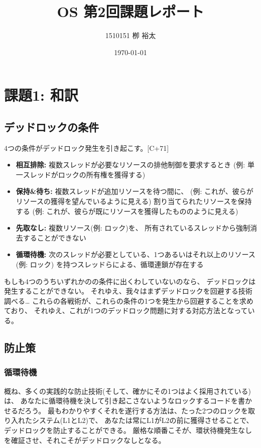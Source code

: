 \documentclass[11pt,a4paper, uplatex]{jsarticle}
\title{OS 第2回課題レポート}
\author{1510151  栁 裕太}
\date{\today}
\begin{document}
\maketitle
\section{課題1: 和訳}

\subsection{デッドロックの条件}
4つの条件がデッドロック発生を引き起こす。[C+71]

\begin{itemize}
  \item \textbf{相互排除:} 複数スレッドが必要なリソースの排他制御を要求するとき
  (例: 単一スレッドがロックの所有権を獲得する)

  \item \textbf{保持\&待ち:} 複数スレッドが追加リソースを待つ間に、
  (例: これが、彼らがリソースの獲得を望んでいるように見える)
  割り当てられたリソースを保持する
  (例: これが、彼らが既にリソースを獲得したもののように見える)

  \item \textbf{先取なし:} 複数リソース(例: ロック)を、
  所有されているスレッドから強制消去することができない

  \item \textbf{循環待機:}
  次のスレッドが必要としている、1つあるいはそれ以上のリソース(例: ロック)
  を持つスレッドらによる、循環連鎖が存在する
\end{itemize}

もしも4つのうちいずれかのの条件に出くわしていないのなら、
デッドロックは発生することができない。
それゆえ、我々はまずデッドロックを回避する技術調べる…
これらの各戦術が、これらの条件の1つを発生から回避することを求めており、
それゆえ、これが1つのデッドロック問題に対する対応方法となっている。

\subsection{防止策}
\subsubsection{循環待機}
概ね、多くの実践的な防止技術(そして、確かにその1つはよく採用されている)は、
あなたに循環待機を決して引き起こさないようなロックするコードを書かせるだろう。
最もわかりやすくそれを遂行する方法は、たった2つのロックを取り入れたシステム(L1とL2)で、
あなたは常にL1がL2の前に獲得させることで、デッドロックを防止することができる。
厳格な順番こそが、環状待機発生なしを確証させ、それこそがデッドロックなしとなる。
\end{document}
